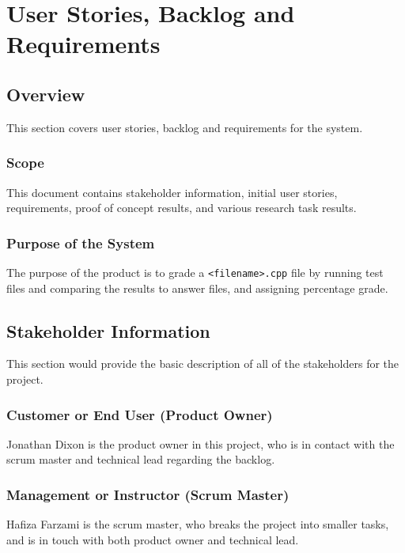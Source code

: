\chapter{User Stories, Backlog and Requirements}
\section{Overview}


This section covers user stories, backlog and requirements for the system.  





\subsection{Scope}

This document contains stakeholder information, 
initial user stories, requirements, proof of concept results, and various research 
task results. 



\subsection{Purpose of the System}
The purpose of the product is to grade a {\tt <filename>.cpp} file by running test files and comparing the results to answer files, and assigning percentage grade. 


\section{ Stakeholder Information}


This section would provide the basic description of all of the stakeholders for 
the project.

\subsection{Customer or End User (Product Owner)}
Jonathan Dixon is the product owner in this project, who is in contact with the scrum master and technical lead regarding the backlog. 

\subsection{Management or Instructor (Scrum Master)}
Hafiza Farzami is the scrum master, who breaks the project into smaller tasks, and is in touch with both product owner and technical lead.

